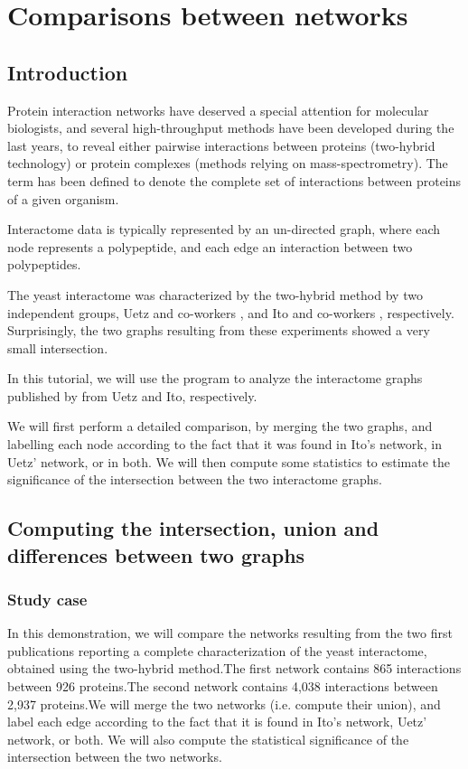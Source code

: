 \chapter{Comparisons between networks}

\section{Introduction}

Protein interaction networks have deserved a special attention for
molecular biologists, and several high-throughput methods have been
developed during the last years, to reveal either pairwise
interactions between proteins (two-hybrid technology) or protein
complexes (methods relying on mass-spectrometry). The term
 has been defined to denote the complete set of
interactions between proteins of a given organism.

Interactome data is typically represented by an un-directed graph,
where each node represents a polypeptide, and each edge an interaction
between two polypeptides.

The yeast interactome was characterized by the two-hybrid method by
two independent groups, Uetz and co-workers \cite{Uetz:2000}, and Ito
and co-workers \cite{Ito:2001}, respectively. Surprisingly, the two
graphs resulting from these experiments showed a very small
intersection.

In this tutorial, we will use the program  to
analyze the interactome graphs published by from Uetz and Ito,
respectively.

We will first perform a detailed comparison, by merging the two
graphs, and labelling each node according to the fact that it was
found in Ito's network, in Uetz' network, or in both. We will then
compute some statistics to estimate the significance of the intersection
between the two interactome graphs.

\section{Computing the intersection, union and differences between two graphs}

\subsection{Study case}

In this demonstration, we will compare the networks resulting from the
two first publications reporting a complete characterization of the
yeast interactome, obtained using the two-hybrid method.The first
network \cite{Uetz:2000} contains 865 interactions between 926
proteins.The second network \cite{Ito:2001} contains 4,038
interactions between 2,937 proteins.We will merge the two networks
(i.e. compute their union), and label each edge according to the fact
that it is found in Ito's network, Uetz' network, or both. We will
also compute the statistical significance of the intersection between
the two networks.


